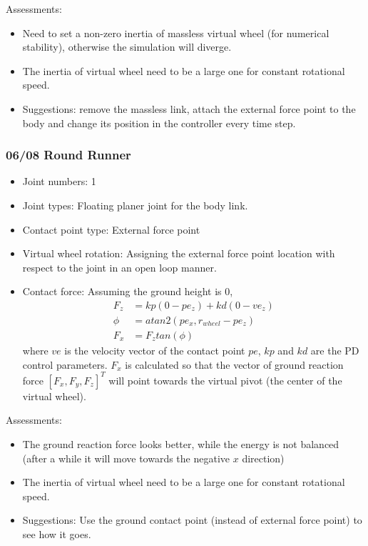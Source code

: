 \documentclass{article}
\begin{document}
Assessments:
\begin{itemize}
\item Need to set a non-zero inertia of massless virtual wheel (for numerical stability), otherwise the simulation will diverge.
\item The inertia of virtual wheel need to be a large one for constant rotational speed.
\item Suggestions: remove the massless link, attach the external force point to the body and change its position in the controller every time step.
\end{itemize}

\subsubsection*{06/08 Round Runner}
\begin{itemize}
\item Joint numbers: 1
\item Joint types: Floating planer joint for the body link.
\item Contact point type: External force point
\item Virtual wheel rotation: Assigning the external force point location with respect to the joint in an open loop manner.
\item 
Contact force: Assuming the ground height is $0$,
\begin{align}
F_z &= kp(0-pe_z) + kd(0 - ve_z)\\
\phi &= atan2(pe_x,r_{wheel}-pe_z)\\
F_x &= F_ztan(\phi)
\end{align}
where $ve$ is the velocity vector of the contact point $pe$, $kp$ and $kd$ are the PD control parameters. $F_x$ is calculated so that the vector of ground reaction force $[F_x,F_y,F_z]^T$ will point towards the virtual pivot (the center of the virtual wheel).\\
\end{itemize}



Assessments:
\begin{itemize}
\item The ground reaction force looks better, while the energy is not balanced (after a while it will move towards the negative $x$ direction)
\item The inertia of virtual wheel need to be a large one for constant rotational speed.
\item Suggestions: Use the ground contact point (instead of external force point) to see how it goes.

\end{itemize}
\end{document}
